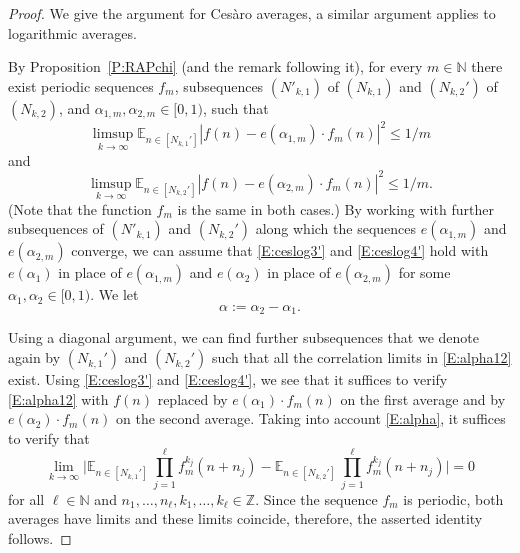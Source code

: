 \documentclass[11pt]{amsart}
\theoremstyle{definition}
\newcommand{\E}{{\mathbb E}}
\newcommand{\N}{{\mathbb N}}
\newcommand{\Z}{{\mathbb Z}}
\begin{document}
\begin{proof}
	We give the argument for Ces\`aro averages, a similar argument applies to logarithmic averages.
	
 By Proposition~\ref{P:RAPchi} (and the remark following it), for every $m\in\N$  there exist
		periodic sequences  $f_m$,
		subsequences $(N'_{k,1})$ of $(N_{k,1})$ and $(N_{k,2}')$ of $(N_{k,2})$,
		and
		$\alpha_{1,m}, \alpha_{2,m}\in[0,1)$, such that
			\begin{equation}\label{E:ceslog3'}
			\limsup_{k\to\infty} \E_{n\in [N_{k,1}']}|f(n)-e(\alpha_{1,m})\cdot  f_m(n)|^2   \leq 1/m
		\end{equation}
		and
		\begin{equation}\label{E:ceslog4'}
			\limsup_{k\to\infty} \E_{n\in [N_{k,2}']}|f(n)-e(\alpha_{2,m})\cdot f_m(n)|^2   \leq 1/m.
		\end{equation}
	(Note that the function $f_m$ is the same in both cases.)
		By working with further subsequences of $(N'_{k,1})$ and $(N_{k,2}')$ along which
	 the sequences	$e(\alpha_{1,m})$ and $e(\alpha_{2,m})$ converge,
		 we can assume that \eqref{E:ceslog3'} and \eqref{E:ceslog4'}
 hold with  $e(\alpha_1)$ in place of $e(\alpha_{1,m})$ and $e(\alpha_2)$ in place of $e(\alpha_{2,m})$ for some $\alpha_1,\alpha_2 \in [0,1)$.   	We let
\begin{equation}\label{E:alpha}
 \alpha:=\alpha_2-\alpha_1.
 \end{equation}
		
		Using a diagonal argument, we can find further subsequences that we denote again by $(N_{k,1}')$ and $(N_{k,2}')$ such that all the correlation limits in \eqref{E:alpha12} exist.  Using \eqref{E:ceslog3'}
		and \eqref{E:ceslog4'}, we see that
it suffices to verify 		\eqref{E:alpha12} with  $f(n)$ replaced by $e(\alpha_{1})\cdot  f_m(n)$  on the first average and  by
$e(\alpha_{2})\cdot f_m(n)$ on the second average.  Taking into account \eqref{E:alpha}, it suffices to verify that
	 $$
	 \lim_{k\to\infty}\Big|\E_{n\in[N_{k,1}']}\,  \prod_{j=1}^\ell f_m^{k_j}(n+n_j)
	 -	\E_{n\in[N_{k,2}']}\,  \prod_{j=1}^\ell  f_m^{k_j}(n+n_j)\Big|=0
	 $$
for 	 all $\ell\in \N$ and $n_1,\ldots, n_\ell, k_1,\ldots, k_\ell\in \Z$.
	Since the sequence $f_m$ is periodic, both averages have limits and these limits coincide, therefore, the asserted identity follows.
\end{proof}
\end{document}
